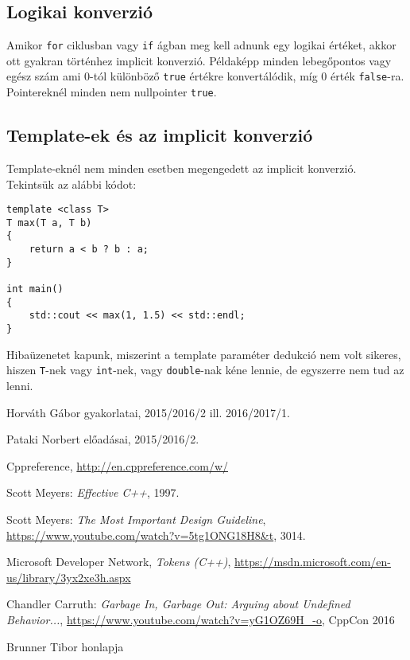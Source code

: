 \documentclass[a4paper,11.5pt,table]{article}
\begin{document}
	\subsection{Logikai konverzió}
	Amikor \texttt{for} ciklusban vagy \texttt{if} ágban meg kell adnunk egy logikai értéket, akkor ott gyakran történhez implicit konverzió. Példaképp minden lebegőpontos vagy egész szám ami 0-tól különböző \texttt{true} értékre konvertálódik, míg 0 érték \texttt{false}-ra. Pointereknél minden nem nullpointer \texttt{true}.
	\subsection{Template-ek és az implicit konverzió}
	Template-eknél nem minden esetben megengedett az implicit konverzió. Tekintsük az alábbi kódot:
	\begin{lstlisting}
template <class T>
T max(T a, T b)
{
	return a < b ? b : a;
}

int main()
{
	std::cout << max(1, 1.5) << std::endl;
}
	\end{lstlisting}
	Hibaüzenetet kapunk, miszerint a template paraméter dedukció nem volt sikeres, hiszen \texttt{T}-nek vagy \texttt{int}-nek, vagy \texttt{double}-nak kéne lennie, de egyszerre nem tud az lenni.
	\begin{thebibliography}{1}
		
		 Horváth Gábor gyakorlatai, 2015/2016/2 ill. 2016/2017/1.
		
		 Pataki Norbert előadásai, 2015/2016/2.
		
		 Cppreference, \url{http://en.cppreference.com/w/}
		
		 Scott Meyers: \textit{Effective C++}, 1997.
		
		 Scott Meyers: \textit{The Most Important Design Guideline}, \url{https://www.youtube.com/watch?v=5tg1ONG18H8&t}, 3014.
		
		  Microsoft Developer Network, \textit{Tokens (C++)}, \url{https://msdn.microsoft.com/en-us/library/3yx2xe3h.aspx}
		
		 Chandler Carruth: \textit{Garbage In, Garbage Out: Arguing about Undefined Behavior...}, \url{https://www.youtube.com/watch?v=yG1OZ69H_-o}, CppCon 2016
		
		 Brunner Tibor honlapja
		
	\end{thebibliography}
\end{document}
